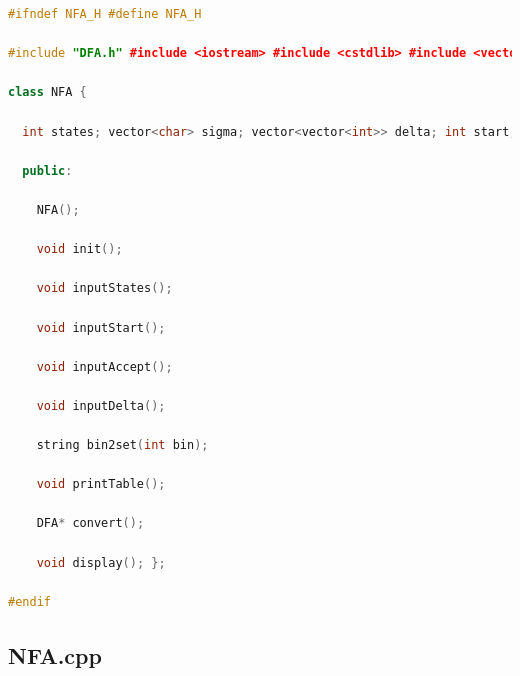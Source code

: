 \documentclass{article}
\begin{document}
\begin{lstlisting}[language=C++]
#ifndef NFA_H #define NFA_H

#include "DFA.h" #include <iostream> #include <cstdlib> #include <vector> #include <string> #include <sstream> #include <iomanip> using namespace std;

class NFA {

  int states; vector<char> sigma; vector<vector<int>> delta; int start; int accept;

  public:

    NFA();

    void init();

    void inputStates();

    void inputStart();

    void inputAccept();

    void inputDelta();

    string bin2set(int bin);

    void printTable();

    DFA* convert();
    
    void display(); };

#endif
\end{lstlisting}

\newpage

\subsection*{NFA.cpp}
\end{document}
